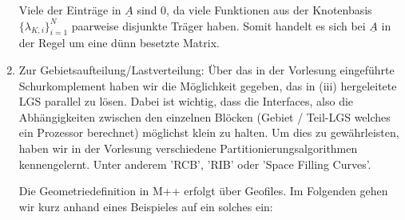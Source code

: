 \documentclass[12pt,a4paper]{scrartcl}
\numberwithin{equation}{section}
\begin{document}
\begin{enumerate}[label=(\roman*)]
	Viele der Einträge in $ \underline{A} $ sind 0, da viele Funktionen aus der Knotenbasis $ \{ \lambda_{K,i} \}_{i = 1}^N $ paarweise disjunkte Träger haben. Somit handelt es sich bei $ \underline{A} $ in der Regel um eine dünn besetzte Matrix.
	

\item Zur Gebietsaufteilung/Lastverteilung: \newline
Über das in der Vorlesung eingeführte Schurkomplement haben wir die Möglichkeit gegeben, das in (iii) hergeleitete LGS parallel zu lösen. Dabei ist wichtig, dass die Interfaces, also die Abhängigkeiten zwischen den einzelnen Blöcken (Gebiet / Teil-LGS welches ein Prozessor berechnet) möglichst klein zu halten. \newline
Um dies zu gewährleisten, haben wir in der Vorlesung verschiedene Partitionierungsalgorithmen kennengelernt. 
Unter anderem 'RCB', 'RIB' oder 'Space Filling Curves'.
\newline
\par
Die Geometriedefinition in M++ erfolgt über Geofiles. Im Folgenden gehen wir kurz anhand eines Beispieles auf ein solches ein: \newline


\end{enumerate}
\end{document}

